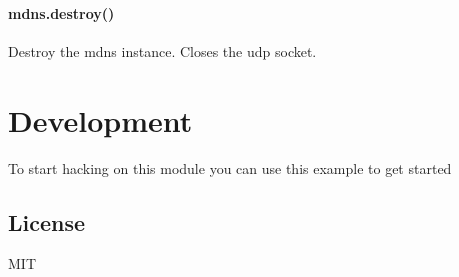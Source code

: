 \paragraph*{{\ttfamily mdns.\+destroy()}}

Destroy the mdns instance. Closes the udp socket.

\section*{Development}

To start hacking on this module you can use this example to get started




\subsection*{License}

M\+IT 